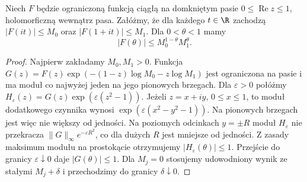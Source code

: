 \begin{lemat}
\label{lem:dt-three-lines}
Niech $F$ będzie ograniczoną funkcją ciągłą na domkniętym
pasie $0\le\operatorname{Re}z\le1$, holomorficzną wewnątrz
pasa. Załóżmy, że dla każdego $t\in\R$ zachodzą
$|F(it)|\le M_0$ oraz $|F(1+it)|\le M_1$.
Dla $0<\theta<1$ mamy
\[
 |F(\theta)|\le M_0^{1-\theta}M_1^\theta.
\]
\end{lemat}
\begin{proof}
Najpierw zakładamy $M_0,M_1>0$. Funkcja
$G(z)=F(z)\exp(-(1-z)\log M_0-z\log M_1)$
jest ograniczona na pasie i ma moduł co najwyżej jeden
na jego pionowych brzegach. Dla $\varepsilon>0$ połóżmy
$H_\varepsilon(z)=G(z)\exp(\varepsilon(z^2-1))$.
Jeżeli $z=x+iy$, $0\le x\le1$, to moduł dodatkowego
czynnika wynosi $\exp(\varepsilon(x^2-y^2-1))$.
Na pionowych brzegach jest więc nie większy od jedności.
Na poziomych odcinkach $y=\pm R$ moduł $H_\varepsilon$
nie przekracza $\|G\|_\infty e^{-\varepsilon R^2}$,
co dla dużych $R$ jest mniejsze od jedności.
Z zasady maksimum modułu na prostokącie otrzymujemy
$|H_\varepsilon(\theta)|\le1$.
Przejście do granicy $\varepsilon\downarrow0$ daje
$|G(\theta)|\le1$. Dla $M_j=0$ stosujemy udowodniony
wynik ze stałymi $M_j+\delta$ i przechodzimy do
granicy $\delta\downarrow0$.
\end{proof}

